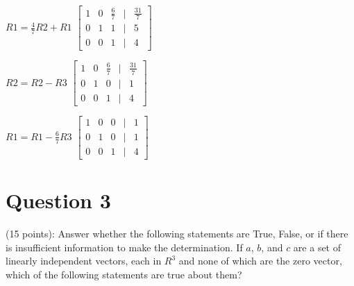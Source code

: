 \documentclass{article}
\begin{document}
\noindent
$R1 = \frac{4}{7}R2 + R1$
$\begin{bmatrix}
1 & 0 & \frac{6}{7} & | & \frac{31}{7} \\
0 & 1 & 1           & | & 5 \\
0 & 0 & 1           & | & 4
\end{bmatrix}$

\noindent
$R2 = R2 - R3$
$\begin{bmatrix}
1 & 0 & \frac{6}{7} & | & \frac{31}{7} \\
0 & 1 & 0           & | & 1 \\
0 & 0 & 1           & | & 4
\end{bmatrix}$

\noindent
$R1 = R1 - \frac{6}{7}R3$
$\begin{bmatrix}
1 & 0 & 0 & | & 1 \\
0 & 1 & 0 & | & 1 \\
0 & 0 & 1 & | & 4
\end{bmatrix}$

%
\vfill\break
\section*{Question 3} (15 points): Answer whether the following statements are True, False, or if there is insufficient information to make the determination.  If $a$, $b$, and $c$ are a set of linearly independent vectors, each in $R^3$ and none of which are the zero vector, which of the following statements are true about them?
\end{document}
